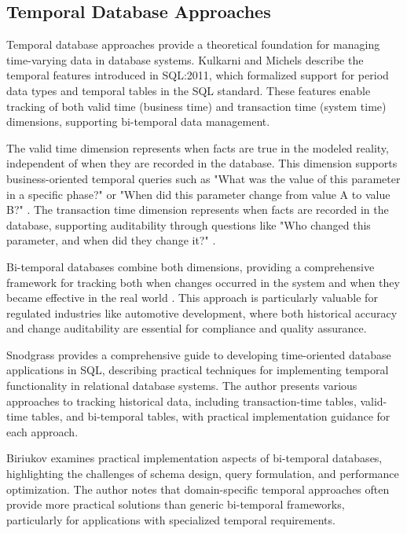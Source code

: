 \subsection{Temporal Database Approaches}
\label{subsec:temporal-database-approaches}

Temporal database approaches provide a theoretical foundation for managing time-varying data in database systems. Kulkarni and Michels \cite{kulkarni2012temporal} describe the temporal features introduced in SQL:2011, which formalized support for period data types and temporal tables in the \ac{SQL} standard. These features enable tracking of both valid time (business time) and transaction time (system time) dimensions, supporting bi-temporal data management.

The valid time dimension represents when facts are true in the modeled reality, independent of when they are recorded in the database. This dimension supports business-oriented temporal queries such as "What was the value of this parameter in a specific phase?" or "When did this parameter change from value A to value B?" \cite{bohlen2018database}. The transaction time dimension represents when facts are recorded in the database, supporting auditability through questions like "Who changed this parameter, and when did they change it?" \cite{kulkarni2012temporal}.

Bi-temporal databases combine both dimensions, providing a comprehensive framework for tracking both when changes occurred in the system and when they became effective in the real world \cite{bohlen2018database}. This approach is particularly valuable for regulated industries like automotive development, where both historical accuracy and change auditability are essential for compliance and quality assurance.

Snodgrass \cite{snodgrass1999developing} provides a comprehensive guide to developing time-oriented database applications in \ac{SQL}, describing practical techniques for implementing temporal functionality in relational database systems. The author presents various approaches to tracking historical data, including transaction-time tables, valid-time tables, and bi-temporal tables, with practical implementation guidance for each approach.

Biriukov \cite{biriukov2018implementation} examines practical implementation aspects of bi-temporal databases, highlighting the challenges of schema design, query formulation, and performance optimization. The author notes that domain-specific temporal approaches often provide more practical solutions than generic bi-temporal frameworks, particularly for applications with specialized temporal requirements.

